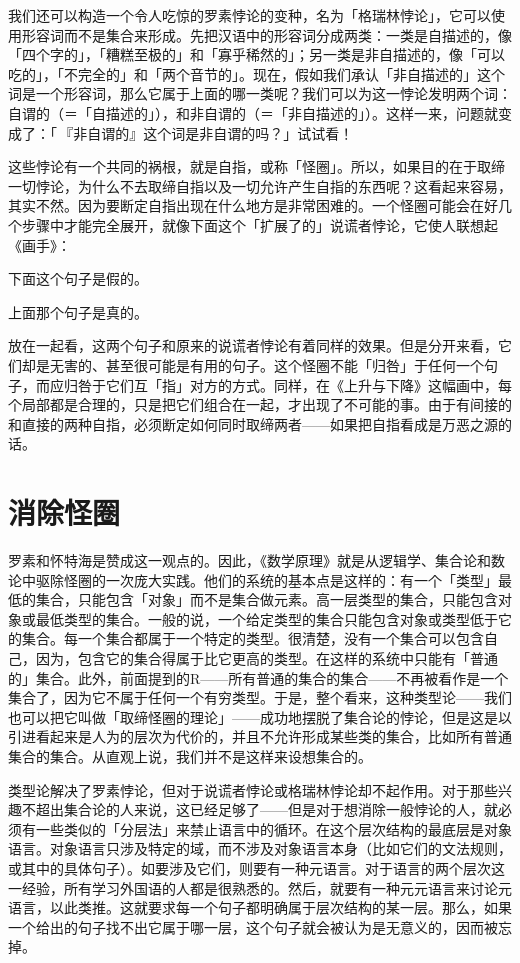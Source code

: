 \documentclass[
  12pt,
  twoside,
  openright,
  oldfontcommands,
]{memoir}
\begin{document}
我们还可以构造一个令人吃惊的罗素悖论的变种，名为「格瑞林悖论」，它可以使用形容词而不是集合来形成。先把汉语中的形容词分成两类：一类是自描述的，像「四个字的」，「糟糕至极的」和「寡乎稀然的」；另一类是非自描述的，像「可以吃的」，「不完全的」和「两个音节的」。现在，假如我们承认「非自描述的」这个词是一个形容词，那么它属于上面的哪一类呢？我们可以为这一悖论发明两个词：自谓的（＝「自描述的」），和非自谓的（＝「非自描述的」）。这样一来，问题就变成了：「\,『非自谓的』这个词是非自谓的吗？」试试看！

这些悖论有一个共同的祸根，就是自指，或称「怪圈」。所以，如果目的在于取缔一切悖论，为什么不去取缔自指以及一切允许产生自指的东西呢？这看起来容易，其实不然。因为要断定自指出现在什么地方是非常困难的。一个怪圈可能会在好几个步骤中才能完全展开，就像下面这个「扩展了的」说谎者悖论，它使人联想起《画手》：

下面这个句子是假的。

上面那个句子是真的。

放在一起看，这两个句子和原来的说谎者悖论有着同样的效果。但是分开来看，它们却是无害的、甚至很可能是有用的句子。这个怪圈不能「归咎」于任何一个句子，而应归咎于它们互「指」对方的方式。同样，在《上升与下降》这幅画中，每个局部都是合理的，只是把它们组合在一起，才出现了不可能的事。由于有间接的和直接的两种自指，必须断定如何同时取缔两者------如果把自指看成是万恶之源的话。

\section{消除怪圈}

罗素和怀特海是赞成这一观点的。因此，《数学原理》就是从逻辑学、集合论和数论中驱除怪圈的一次庞大实践。他们的系统的基本点是这样的：有一个「类型」最低的集合，只能包含「对象」而不是集合做元素。高一层类型的集合，只能包含对象或最低类型的集合。一般的说，一个给定类型的集合只能包含对象或类型低于它的集合。每一个集合都属于一个特定的类型。很清楚，没有一个集合可以包含自己，因为，包含它的集合得属于比它更高的类型。在这样的系统中只能有「普通的」集合。此外，前面提到的R------所有普通的集合的集合------不再被看作是一个集合了，因为它不属于任何一个有穷类型。于是，整个看来，这种类型论------我们也可以把它叫做「取缔怪圈的理论」------成功地摆脱了集合论的悖论，但是这是以引进看起来是人为的层次为代价的，并且不允许形成某些类的集合，比如所有普通集合的集合。从直观上说，我们并不是这样来设想集合的。

类型论解决了罗素悖论，但对于说谎者悖论或格瑞林悖论却不起作用。对于那些兴趣不超出集合论的人来说，这已经足够了------但是对于想消除一般悖论的人，就必须有一些类似的「分层法」来禁止语言中的循环。在这个层次结构的最底层是对象语言。对象语言只涉及特定的域，而不涉及对象语言本身（比如它们的文法规则，或其中的具体句子）。如要涉及它们，则要有一种元语言。对于语言的两个层次这一经验，所有学习外国语的人都是很熟悉的。然后，就要有一种元元语言来讨论元语言，以此类推。这就要求每一个句子都明确属于层次结构的某一层。那么，如果一个给出的句子找不出它属于哪一层，这个句子就会被认为是无意义的，因而被忘掉。
\end{document}
